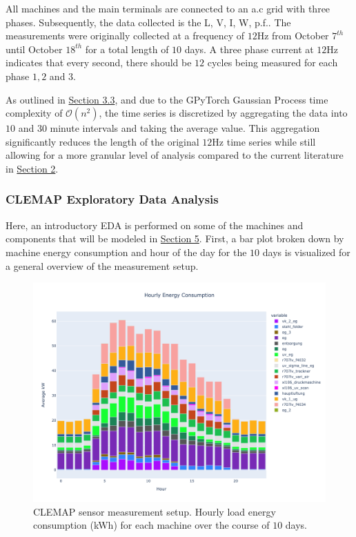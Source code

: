 All machines and the main terminals are connected to an \ac{a.c} grid with three phases. Subsequently, the data collected is the \ac{L}, V, I, W, \ac{p.f.}. The measurements were originally collected at a frequency of $12$Hz from October $7^{th}$ until October $18^{th}$ for a total length of $10$ days. A three phase current at $12$Hz indicates that every second, there should be $12$ cycles being measured for each phase $1, 2$ and $3$. 

As outlined in \hyperlink{subsection.3.3}{Section 3.3}, and due to the GPyTorch Gaussian Process time complexity of $\mathcal{O}(n^2)$, the time series is discretized by aggregating the data into $10$ and $30$ minute intervals and taking the average value. This aggregation significantly reduces the length of the original $12$Hz time series while still allowing for a more granular level of analysis compared to the current literature in \hyperlink{section.2}{Section 2}.

\subsubsection{CLEMAP Exploratory Data Analysis}

Here, an introductory EDA is performed on some of the machines and components that will be modeled in \hyperlink{section.5}{Section 5}. First, a bar plot broken down by machine energy consumption and hour of the day for the $10$ days is visualized for a general overview of the measurement setup.

\begin{figure}[htp]
\centering
\graphicspath{ {./images/} }
\includegraphics[scale=0.47]{images/hourly_load_barplot.png}
\caption{CLEMAP sensor measurement setup. Hourly load energy consumption (kWh) for each machine over the course of $10$ days.}
\label{fig:fig6}
\end{figure}

